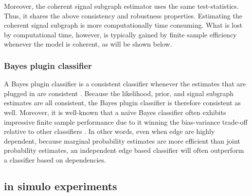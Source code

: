 \documentclass[10pt,journal,cspaper,compsoc]{IEEEtran}
\begin{document}
Moreover, the coherent signal subgraph estimator uses the same test-statistics.  Thus, it shares the above consistency and robustness properties.  Estimating the coherent signal subgraph is more computationally time consuming. What is lost by computational time, however, is typically gained by finite sample efficiency whenever the model is coherent, as will be shown below.


\subsubsection{Bayes plugin classifier}

A Bayes plugin classifier is a consistent classifier whenever the estimates that are plugged in are consistent \cite{Bickel2000}.  Because the likelihood, prior, and signal subgraph estimates are all consistent, the Bayes plugin classifier is therefore consistent as well.  Moreover, it is well-known that a na\"ive Bayes classifier often exhibits impressive finite sample performance due to it winning the bias-variance trade-off relative to other classifiers \cite{Hand2001}.  In other words, even when edge are highly dependent, because marginal probability estimates are more efficient than joint probability estimates, an independent edge based classifier will often outperform a classifier based on dependencies.



\subsection{in simulo experiments} %
\label{sub:subsection_name}
\end{document}
